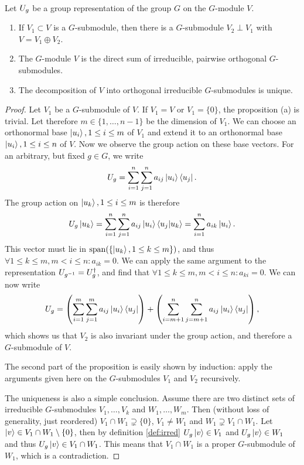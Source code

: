 \documentclass[a4paper,11pt, BCOR=4mm, DIV=12, pagesize]{scrartcl}
\begin{document}
\begin{prop}\ \label{thm:directsum}\\
 Let $U_{g}$ be a group representation of the group $G$ on the $G$-module 
$V$.  
\begin{enumerate}\renewcommand{\labelenumi}{(\alph{enumi})}
 \item If $V_1\subset V$ is a $G$-submodule, then there is a $G$-submodule 
  $V_2\perp V_1$ with $V = V_1 \oplus V_2$. 
\item The $G$-module $V$ is the direct sum of irreducible, pairwise orthogonal 
  $G$-submodules.
  \item The decomposition of $V$ into orthogonal irreducible $G$-submodules is 
unique.
\end{enumerate}
\end{prop}
\begin{proof}
 Let $V_1$ be a $G$-submodule of $V$. If $V_1 = V$ or $V_1 = \{0\}$, the 
proposition (a) is trivial. Let therefore $m\in\{1,\ldots,n-1\}$ be the 
dimension of $V_1$. We can choose an orthonormal base $\ket{u_i}, 1\leq i\leq m$ 
of $V_1$ and extend it to an orthonormal base $\ket{u_i}, 1\leq i\leq n$ of $V$. 
Now we observe the group action on these base vectors. For an arbitrary, but 
fixed $g\in G$, we write 
\begin{equation}
 U_{g} = \sum\limits_{i=1}^{n}\sum\limits_{j=1}^{n} a_{ij} \ket{u_i}\bra{u_j}.
\end{equation}
The group action on $\ket{u_k}, 1\leq i\leq m$ is therefore
\begin{equation}
 U_{g}\ket{u_k} = \sum\limits_{i=1}^{n}\sum\limits_{j=1}^{n} a_{ij} 
\ket{u_i}\braket{u_j|u_k} = \sum\limits_{i=1}^{n} a_{ik}\ket{u_i}.
\end{equation}
This vector must lie in $\mathrm{span}(\{\ket{u_k}, 1\leq k\leq m\})$, and thus 
$\forall 1\leq k\leq m, m<i\leq n: a_{ik} = 0$. We can apply the same argument 
to the representation $U_{g^{-1}} = U_{g}^\dagger$, and find that 
$\forall 1\leq k\leq m, m<i\leq n: a_{ki} = 0$. We can now write 
\begin{equation}\label{eq:repsum}
 U_{g} = \left(\sum\limits_{i=1}^{m}\sum\limits_{j=1}^{m} a_{ij} 
\ket{u_i}\bra{u_j}\right) + \left(\sum\limits_{i=m+1}^{n}\sum\limits_{j=m+1}^{n} a_{ij} 
\ket{u_i}\bra{u_j}\right),
\end{equation}
which shows us that $V_2$ is also invariant under the group action, and 
therefore a $G$-submodule of $V$.

The second part of the proposition is easily shown by induction: apply 
the arguments given here on the $G$-submodules $V_1$ and $V_2$ recursively.

The uniqueness is also a simple conclusion. Assume there are two distinct sets 
of irreducible $G$-submodules $V_1,\ldots,V_k$ and $W_1,\ldots,W_m$. Then 
(without loss of generality, just reordered) $V_1\cap W_1\supsetneq\{0\}$, 
$V_1\neq W_1$ and $W_1\supsetneq V_1\cap W_1$. Let $\ket{v}\in V_1\cap 
W_1\setminus\{0\}$, then by definition \ref{def:irred} $U_g\ket{v}\in V_1$ and 
$U_g\ket{v}\in W_1$ and thus $U_g\ket{v}\in V_1\cap W_1$. This means that 
$V_1\cap W_1$ is a proper $G$-submodule of $W_1$, which is a contradiction.
\end{proof}
\end{document}
